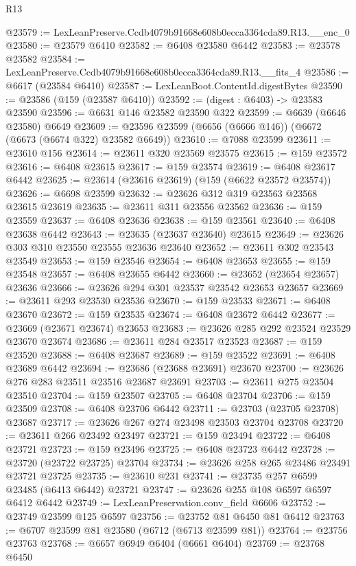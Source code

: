 \begin{lexlean}{R13}
\begin{coremodule}
@23579 := LexLeanPreserve.Ccdb4079b91668e608b0ecca3364cda89.R13.__enc_0
@23580 := @23579 @6410
@23582 := @6408 @23580 @6442
@23583 := @23578 @23582
@23584 := LexLeanPreserve.Ccdb4079b91668e608b0ecca3364cda89.R13.__fits_4
@23586 := @6617 (@23584 @6410)
@23587 := LexLeanBoot.ContentId.digestBytes
@23590 := @23586 (@159 (@23587 @6410))
@23592 := (digest : @6403) -> @23583 @23590
@23596 := @6631 @146 @23582 @23590 @322
@23599 := @6639 (@6646 @23580) @6649
@23609 := @23596 @23599 (@6656 (@6666 @146)) (@6672 (@6673 (@6674 @322) @23582 @6649))
@23610 := @7088 @23599
@23611 := @23610 @156
@23614 := @23611 @320 @23569 @23575
@23615 := @159 @23572
@23616 := @6408 @23615
@23617 := @159 @23574
@23619 := @6408 @23617 @6442
@23625 := @23614 (@23616 @23619) (@159 (@6622 @23572 @23574))
@23626 := @6698 @23599
@23632 := @23626 @312 @319 @23563 @23568 @23615 @23619
@23635 := @23611 @311 @23556 @23562
@23636 := @159 @23559
@23637 := @6408 @23636
@23638 := @159 @23561
@23640 := @6408 @23638 @6442
@23643 := @23635 (@23637 @23640) @23615
@23649 := @23626 @303 @310 @23550 @23555 @23636 @23640
@23652 := @23611 @302 @23543 @23549
@23653 := @159 @23546
@23654 := @6408 @23653
@23655 := @159 @23548
@23657 := @6408 @23655 @6442
@23660 := @23652 (@23654 @23657) @23636
@23666 := @23626 @294 @301 @23537 @23542 @23653 @23657
@23669 := @23611 @293 @23530 @23536
@23670 := @159 @23533
@23671 := @6408 @23670
@23672 := @159 @23535
@23674 := @6408 @23672 @6442
@23677 := @23669 (@23671 @23674) @23653
@23683 := @23626 @285 @292 @23524 @23529 @23670 @23674
@23686 := @23611 @284 @23517 @23523
@23687 := @159 @23520
@23688 := @6408 @23687
@23689 := @159 @23522
@23691 := @6408 @23689 @6442
@23694 := @23686 (@23688 @23691) @23670
@23700 := @23626 @276 @283 @23511 @23516 @23687 @23691
@23703 := @23611 @275 @23504 @23510
@23704 := @159 @23507
@23705 := @6408 @23704
@23706 := @159 @23509
@23708 := @6408 @23706 @6442
@23711 := @23703 (@23705 @23708) @23687
@23717 := @23626 @267 @274 @23498 @23503 @23704 @23708
@23720 := @23611 @266 @23492 @23497
@23721 := @159 @23494
@23722 := @6408 @23721
@23723 := @159 @23496
@23725 := @6408 @23723 @6442
@23728 := @23720 (@23722 @23725) @23704
@23734 := @23626 @258 @265 @23486 @23491 @23721 @23725
@23735 := @23610 @231
@23741 := @23735 @257 @6599 @23485 (@6413 @6442) @23721
@23747 := @23626 @255 @108 @6597 @6597 @6412 @6442
@23749 := LexLeanPreservation.conv_field @6606
@23752 := @23749 @23599 @125 @6597
@23756 := @23752 @81 @6450 @81 @6412
@23763 := @6707 @23599 @81 @23580 (@6712 (@6713 @23599 @81))
@23764 := @23756 @23763
@23768 := @6657 @6949 @6404 (@6661 @6404)
@23769 := @23768 @6450

\end{coremodule}
\end{lexlean}
